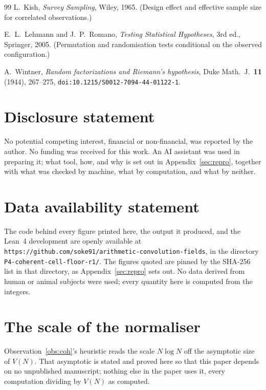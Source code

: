 \documentclass[11pt,a4paper]{article}
\theoremstyle{plain}
\theoremstyle{definition}
\theoremstyle{remark}
\begin{document}
\begin{thebibliography}{99}
 L.~Kish, \emph{Survey Sampling}, Wiley, 1965. (Design
effect and effective sample size for correlated observations.)

 E.~L.~Lehmann and J.~P.~Romano, \emph{Testing Statistical
Hypotheses}, 3rd ed., Springer, 2005. (Permutation and randomisation
tests conditional on the observed configuration.)

 A.~Wintner, \emph{Random factorizations and
Riemann's hypothesis}, Duke Math.\ J.\ \textbf{11} (1944), 267--275,
\texttt{doi:10.1215/S0012-7094-44-01122-1}.

\end{thebibliography}

\section*{Disclosure statement}

No potential competing interest, financial or non-financial, was
reported by the author. No funding was received for this work. An AI
assistant was used in preparing it; what tool, how, and why is set out
in Appendix~\ref{sec:repro}, together with what was checked by machine,
what by computation, and what by neither.

\section*{Data availability statement}

The code behind every figure printed here, the output it produced, and
the Lean~4 development are openly available at
\texttt{https://github.com/soke91/arithmetic-convolution-fields}, in
the directory \texttt{P4-coherent-cell-floor-r1/}. The figures quoted
are pinned by the SHA-256 list in that directory, as
Appendix~\ref{sec:repro} sets out. No data derived
from human or animal subjects were used; every quantity here is
computed from the integers.

\appendix
\section{The scale of the normaliser}\label{sec:scale}

Observation~\ref{obs:coh}'s heuristic reads the scale $N\log N$ off the
asymptotic size of $V(N)$. That asymptotic is stated and proved here so
that this paper depends on no unpublished manuscript; nothing else in
the paper uses it, every computation dividing by $V(N)$ as computed.
\end{document}
